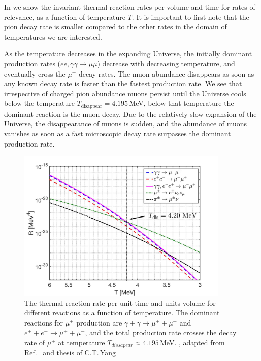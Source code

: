 In  we show the invariant thermal reaction rates per volume and time for rates of relevance, as a function of temperature $T$. It is important to first note that the pion decay rate is smaller compared to the other rates in the domain of temperatures we are interested.

As the temperature decreases in the expanding Universe, the initially dominant production rates ($e\bar e,\gamma\gamma\to\mu\bar\mu$) decrease with decreasing temperature, and eventually cross the $\mu^\pm$ decay rates.  The muon abundance disappears as soon as any known decay rate is faster than the fastest production rate.  We see that irrespective of charged pion  abundance muons persist until the Universe cools below the temperature $T_\mathrm{disappear}=4.195$\,MeV, below that temperature the dominant reaction is the muon decay. Due to the relatively slow expansion of the Universe, the disappearance of muons is sudden, and the abundance of muons vanishes as soon as a fast microscopic decay rate surpasses the dominant production rate.
 
\begin{figure}
\centerline{\includegraphics[width=0.9\textwidth]{./plots/MuonRate_new2.jpg}}
\caption{The thermal reaction rate per unit time and units volume for different reactions as a function of temperature. The dominant reactions for $\mu^\pm$ production are ${\gamma+\gamma\to\mu^++\mu^-}$ and $e^++e^-\to\mu^++\mu^-$, and the total production rate crosses the decay rate of $\mu^\pm$ at temperature $T_{dissapear}\approx 4.195$\,MeV. , adapted from Ref.~\cite{Rafelski:2021aey} and thesis of C.T.\,Yang~\cite{Yang:2024ret}}
\label{MuonRatenew:fig} 
\end{figure}

